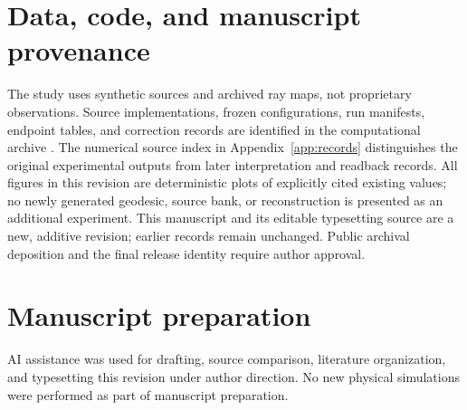 \section*{Data, code, and manuscript provenance}
The study uses synthetic sources and archived ray maps, not proprietary observations. Source implementations, frozen configurations, run manifests, endpoint tables, and correction records are identified in the computational archive \cite{archive}. The numerical source index in Appendix~\ref{app:records} distinguishes the original experimental outputs from later interpretation and readback records. All figures in this revision are deterministic plots of explicitly cited existing values; no newly generated geodesic, source bank, or reconstruction is presented as an additional experiment. This manuscript and its editable typesetting source are a new, additive revision; earlier records remain unchanged. Public archival deposition and the final release identity require author approval.

\section*{Manuscript preparation}
AI assistance was used for drafting, source comparison, literature organization, and typesetting this revision under author direction. No new physical simulations were performed as part of manuscript preparation.
\FloatBarrier
